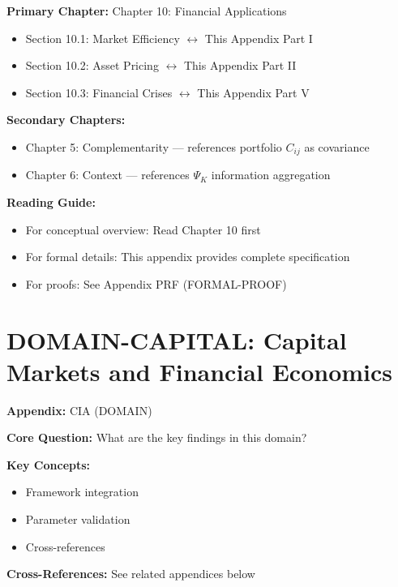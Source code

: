 \begin{tcolorbox}[colback=purple!5!white, colframe=purple!75!black,
    title=Chapter Linkage]

\textbf{Primary Chapter:} Chapter 10: Financial Applications
\begin{itemize}[nosep]
\item Section 10.1: Market Efficiency $\leftrightarrow$ This Appendix Part I
\item Section 10.2: Asset Pricing $\leftrightarrow$ This Appendix Part II
\item Section 10.3: Financial Crises $\leftrightarrow$ This Appendix Part V
\end{itemize}

\textbf{Secondary Chapters:}
\begin{itemize}[nosep]
\item Chapter 5: Complementarity --- references portfolio $C_{ij}$ as covariance
\item Chapter 6: Context --- references $\Psi_K$ information aggregation
\end{itemize}

\textbf{Reading Guide:}
\begin{itemize}[nosep]
\item For conceptual overview: Read Chapter 10 first
\item For formal details: This appendix provides complete specification
\item For proofs: See Appendix PRF (FORMAL-PROOF)
\end{itemize}

\end{tcolorbox}

\chapter{DOMAIN-CAPITAL: Capital Markets and Financial Economics}
\label{app:capital-markets}

\begin{tcolorbox}[colback=blue!5!white, colframe=blue!75!black,
    title=Quick Reference: Appendix CIA]

\textbf{Appendix:} CIA (DOMAIN)

\textbf{Core Question:} What are the key findings in this domain?

\textbf{Key Concepts:}
\begin{itemize}[nosep]
\item Framework integration
\item Parameter validation
\item Cross-references
\end{itemize}

\textbf{Cross-References:} See related appendices below
\end{tcolorbox}

